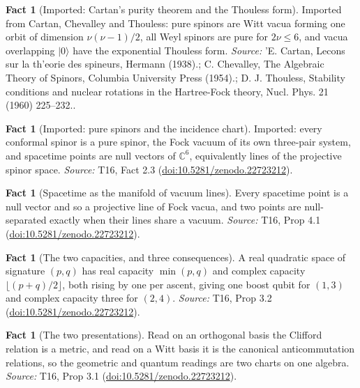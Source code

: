 \documentclass[11pt]{article}
\theoremstyle{definition}
\newtheorem{fact}[theorem]{Fact}
\theoremstyle{plain}
\providecommand{\C}{}\renewcommand{\C}{\mathbb{C}}
\providecommand{\ket}{}\renewcommand{\ket}[1]{|#1\rangle}
\begin{document}
\begin{fact}[Imported: Cartan's purity theorem and the Thouless form]\label{c:one-relation.imported-cartans-purity-theorem-thouless-form}
Imported from Cartan, Chevalley and Thouless: pure spinors are Witt vacua forming one orbit of dimension $\nu(\nu-1)/2$, all Weyl spinors are pure for $2\nu \leq 6$, and vacua overlapping $\ket{0}$ have the exponential Thouless form.
\emph{Source:} 'E. Cartan, Lecons sur la th'eorie des spineurs, Hermann (1938).; C. Chevalley, The Algebraic Theory of Spinors, Columbia University Press (1954).; D. J. Thouless, Stability conditions and nuclear rotations in the Hartree-Fock theory, Nucl. Phys. 21 (1960) 225--232..
\end{fact}

\begin{fact}[Imported: pure spinors and the incidence chart]\label{c:one-relation.imported-pure-spinors-incidence-chart}
Imported: every conformal spinor is a pure spinor, the Fock vacuum of its own three-pair system, and spacetime points are null vectors of $\C^6$, equivalently lines of the projective spinor space.
\emph{Source:} T16, Fact 2.3 (\href{https://doi.org/10.5281/zenodo.22723212}{doi:10.5281/zenodo.22723212}).
\end{fact}

\begin{fact}[Spacetime as the manifold of vacuum lines]\label{c:one-relation.spacetime-manifold-vacuum-lines}
Every spacetime point is a null vector and so a projective line of Fock vacua, and two points are null-separated exactly when their lines share a vacuum.
\emph{Source:} T16, Prop 4.1 (\href{https://doi.org/10.5281/zenodo.22723212}{doi:10.5281/zenodo.22723212}).
\end{fact}

\begin{fact}[The two capacities, and three consequences]\label{c:one-relation.two-capacities-three-consequences}
A real quadratic space of signature $(p,q)$ has real capacity $\min(p,q)$ and complex capacity $\lfloor (p+q)/2 \rfloor$, both rising by one per ascent, giving one boost qubit for $(1,3)$ and complex capacity three for $(2,4)$.
\emph{Source:} T16, Prop 3.2 (\href{https://doi.org/10.5281/zenodo.22723212}{doi:10.5281/zenodo.22723212}).
\end{fact}

\begin{fact}[The two presentations]\label{c:one-relation.two-presentations}
Read on an orthogonal basis the Clifford relation is a metric, and read on a Witt basis it is the canonical anticommutation relations, so the geometric and quantum readings are two charts on one algebra.
\emph{Source:} T16, Prop 3.1 (\href{https://doi.org/10.5281/zenodo.22723212}{doi:10.5281/zenodo.22723212}).
\end{fact}
\end{document}

